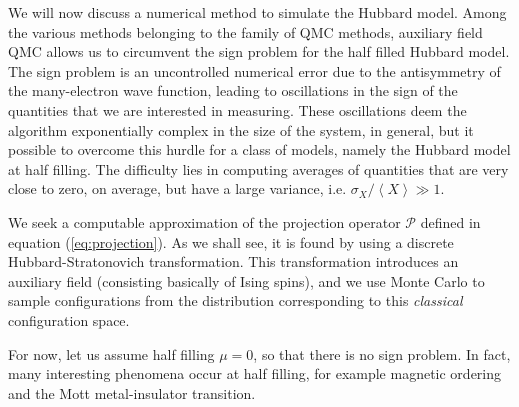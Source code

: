 
\label{cap:finiteTafqmc}

We will now discuss a numerical method to simulate the Hubbard model. Among the various methods belonging to the family of QMC methods, auxiliary field QMC allows us to circumvent the sign problem for the half filled Hubbard model. The sign problem is an uncontrolled numerical error due to the antisymmetry of the many-electron wave function, leading to oscillations in the sign of the quantities that we are interested in measuring. These oscillations deem the algorithm exponentially complex in the size of the system, in general, but it possible to overcome this hurdle for a class of models, namely the Hubbard model at half filling. The difficulty lies in computing averages of quantities that are very close to zero, on average, but have a large variance, i.e. $\sigma_X / \left\langle X \right\rangle \gg 1$.

We seek a computable approximation of the projection operator $\mathcal{P}$ defined in equation (\ref{eq:projection}). As we shall see, it is found by using a discrete Hubbard-Stratonovich transformation. This transformation introduces an auxiliary field (consisting basically of Ising spins), and we use Monte Carlo to sample configurations from the distribution corresponding to this \emph{classical} configuration space.

For now, let us assume half filling $\mu = 0$, so that there is no sign problem. In fact, many interesting phenomena occur at half filling, for example magnetic ordering and the Mott metal-insulator transition.



\cleardoublepage
